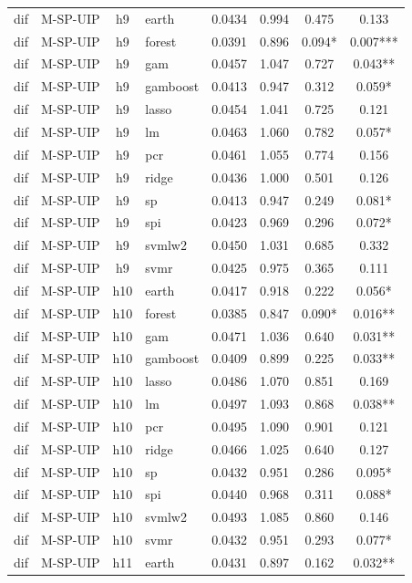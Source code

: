 \begin{ThreePartTable}
\begin{longtable}[t]{llclcccc}
\addlinespace
dif & M-SP-UIP & h9 & earth & 0.0434 & 0.994 & 0.475 & 0.133\\
dif & M-SP-UIP & h9 & forest & 0.0391 & 0.896 & 0.094* & 0.007***\\
dif & M-SP-UIP & h9 & gam & 0.0457 & 1.047 & 0.727 & 0.043**\\
dif & M-SP-UIP & h9 & gamboost & 0.0413 & 0.947 & 0.312 & 0.059*\\
dif & M-SP-UIP & h9 & lasso & 0.0454 & 1.041 & 0.725 & 0.121\\
dif & M-SP-UIP & h9 & lm & 0.0463 & 1.060 & 0.782 & 0.057*\\
dif & M-SP-UIP & h9 & pcr & 0.0461 & 1.055 & 0.774 & 0.156\\
dif & M-SP-UIP & h9 & ridge & 0.0436 & 1.000 & 0.501 & 0.126\\
dif & M-SP-UIP & h9 & sp & 0.0413 & 0.947 & 0.249 & 0.081*\\
dif & M-SP-UIP & h9 & spi & 0.0423 & 0.969 & 0.296 & 0.072*\\
dif & M-SP-UIP & h9 & svmlw2 & 0.0450 & 1.031 & 0.685 & 0.332\\
dif & M-SP-UIP & h9 & svmr & 0.0425 & 0.975 & 0.365 & 0.111\\
\addlinespace
dif & M-SP-UIP & h10 & earth & 0.0417 & 0.918 & 0.222 & 0.056*\\
dif & M-SP-UIP & h10 & forest & 0.0385 & 0.847 & 0.090* & 0.016**\\
dif & M-SP-UIP & h10 & gam & 0.0471 & 1.036 & 0.640 & 0.031**\\
dif & M-SP-UIP & h10 & gamboost & 0.0409 & 0.899 & 0.225 & 0.033**\\
dif & M-SP-UIP & h10 & lasso & 0.0486 & 1.070 & 0.851 & 0.169\\
dif & M-SP-UIP & h10 & lm & 0.0497 & 1.093 & 0.868 & 0.038**\\
dif & M-SP-UIP & h10 & pcr & 0.0495 & 1.090 & 0.901 & 0.121\\
dif & M-SP-UIP & h10 & ridge & 0.0466 & 1.025 & 0.640 & 0.127\\
dif & M-SP-UIP & h10 & sp & 0.0432 & 0.951 & 0.286 & 0.095*\\
dif & M-SP-UIP & h10 & spi & 0.0440 & 0.968 & 0.311 & 0.088*\\
dif & M-SP-UIP & h10 & svmlw2 & 0.0493 & 1.085 & 0.860 & 0.146\\
dif & M-SP-UIP & h10 & svmr & 0.0432 & 0.951 & 0.293 & 0.077*\\
\addlinespace
dif & M-SP-UIP & h11 & earth & 0.0431 & 0.897 & 0.162 & 0.032**\\

\end{longtable}
\end{ThreePartTable}
